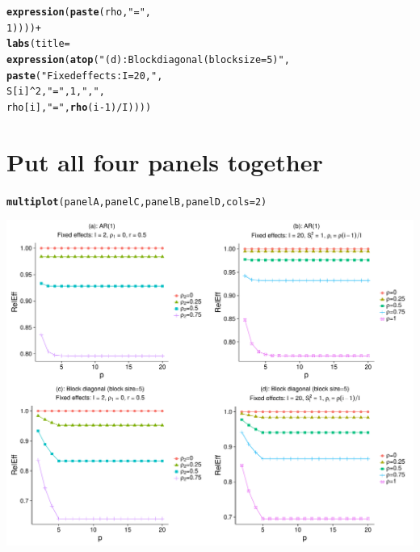 \documentclass{article}\usepackage[]{graphicx}\usepackage[]{color}
\makeatletter
\def\maxwidth{ %
  \ifdim\Gin@nat@width>\linewidth
    \linewidth
  \else
    \Gin@nat@width
  \fi
}
\newcommand{\hlnum}[1]{\textcolor[rgb]{0.686,0.059,0.569}{#1}}%
\newcommand{\hlstr}[1]{\textcolor[rgb]{0.192,0.494,0.8}{#1}}%
\newcommand{\hlopt}[1]{\textcolor[rgb]{0,0,0}{#1}}%
\newcommand{\hlstd}[1]{\textcolor[rgb]{0.345,0.345,0.345}{#1}}%
\newcommand{\hlkwc}[1]{\textcolor[rgb]{0.333,0.667,0.333}{#1}}%
\newcommand{\hlkwd}[1]{\textcolor[rgb]{0.737,0.353,0.396}{\textbf{#1}}}%
\newenvironment{kframe}{%
 \def\at@end@of@kframe{}%
 \ifinner\ifhmode%
  \def\at@end@of@kframe{\end{minipage}}%
  \begin{minipage}{\columnwidth}%
 \fi\fi%
 \def\FrameCommand##1{\hskip\@totalleftmargin \hskip-\fboxsep
 \colorbox{shadecolor}{##1}\hskip-\fboxsep
     \hskip-\linewidth \hskip-\@totalleftmargin \hskip\columnwidth}%
 \MakeFramed {\advance\hsize-\width
   \@totalleftmargin\z@ \linewidth\hsize
   \@setminipage}}%
 {\par\unskip\endMakeFramed%
 \at@end@of@kframe}
\newenvironment{knitrout}{}{} %
\makeatother
\begin{document}
\begin{knitrout}
\begin{kframe}
\begin{alltt}
                           \hlkwd{expression}\hlstd{(}\hlkwd{paste}\hlstd{(rho,} \hlstr{"="}\hlstd{,}
                                            \hlnum{1}\hlstd{))))} \hlopt{+}
  \hlkwd{labs}\hlstd{(}\hlkwc{title}\hlstd{=}
         \hlkwd{expression}\hlstd{(}\hlkwd{atop}\hlstd{(}\hlstr{"(d): Block diagonal (block size=5)"}\hlstd{,}
                         \hlkwd{paste}\hlstd{(}\hlstr{"Fixed effects: I = 20, "}\hlstd{,}
                               \hlstd{S[i]}\hlopt{^}\hlnum{2}\hlstd{,} \hlstr{" = "}\hlstd{,} \hlnum{1}\hlstd{,} \hlstr{", "}\hlstd{,}
                               \hlstd{rho[i],} \hlstr{" = "}\hlstd{,} \hlkwd{rho}\hlstd{(i}\hlopt{-}\hlnum{1}\hlstd{)}\hlopt{/}\hlstd{I))))}
\end{alltt}
\end{kframe}
\end{knitrout}

\section{Put all four panels together}

\begin{knitrout}
\color{fgcolor}\begin{kframe}
\begin{alltt}
\hlkwd{multiplot}\hlstd{(panelA, panelC, panelB, panelD,} \hlkwc{cols}\hlstd{=}\hlnum{2}\hlstd{)}
\end{alltt}


{\ttfamily\noindent\itshape\color{messagecolor}{\#\# Loading required package: grid}}\end{kframe}

{\centering \includegraphics[width=\maxwidth]{figures/Figure_S3_panels_abcd-1} 

}



\end{knitrout}
\end{document}
